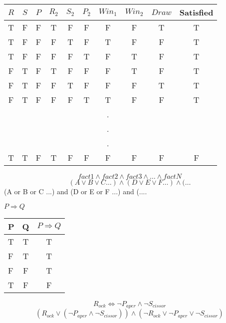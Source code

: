 \documentclass[24pt,a4paper]{article}
\begin{document}
\begin{center}
\begin{tabular}{ c c c c c c c c c | c }
	$R$ & $S$ & $P$ & 	$R_{2}$ & $S_{2}$ & $P_{2}$ & $Win_{1}$ & $Win_{2}$ & $Draw$ & Satisfied\\ \hline
	{\color{green}T} & F & F & {\color{green}T} & F & F & F & F & T & {\color{green}T} \\ \hline
	\rowcolor{green}
	{\color{white}T} & F & F & F & {\color{white}T} & F & {\color{white}T} & F & F & {\color{white}T} \\ \hline
	{\color{green}T} & F & F & F & F & {\color{green}T} & F & {\color{green}T} & F & {\color{green}T} \\ \hline
	F & {\color{green}T} & F & {\color{green}T} & F & F & F & {\color{green}T} & F & {\color{green}T} \\ \hline
	F & {\color{green}T} & F & F & {\color{green}T} & F & F & F & {\color{green}T} & {\color{green}T} \\ \hline
	F & {\color{green}T} & F & F & F & {\color{green}T} & {\color{green}T} & F & F & {\color{green}T} \\ \hline
	& & & & & & . \\
	& & & & & & . \\
	& & & & & & . \\
	\rowcolor{red}
	{\color{white}T} & {\color{white}T} & F & {\color{white}T} & F & F & F & F & F & F \\
	

\end{tabular}
\end{center}
$$fact1 \land fact2 \land fact3 \land \dots \land factN$$
$$ (A \lor B \lor C \dots) \land (D \lor E \lor F \dots) \land (\dots $$
(A or B or C ...) and (D or E or F ...) and (....

$P \Rightarrow Q$
\begin{center}
\begin{tabular}{l | c | c}
 	P & Q & $P \Rightarrow Q$ \\ \hline
	T & T & T \\ \hline
	F & T & T \\ \hline
	F & F & T \\ \hline
	T & F & F \\ \hline
\end{tabular}
\end{center}
\begin{equation}
R_{ock} \Leftrightarrow \lnot P_{aper} \land \lnot S_{cissor}
\end{equation}
\begin{equation}
(R_{ock} \lor (\lnot P_{aper} \land \lnot S_{cissor})) \land (\lnot R_{ock} \lor \lnot P_{aper} \lor \lnot S_{cissor})
\end{equation}
\end{document}
